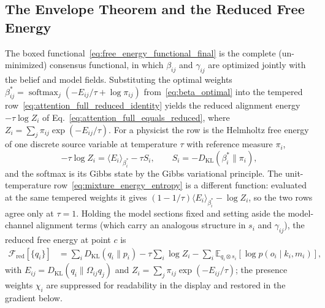 \documentclass[11pt]{article}
\begin{document}
\subsection{The Envelope Theorem and the Reduced Free Energy}
\label{sec:envelope_theorem}

The boxed functional~\eqref{eq:free_energy_functional_final} is the complete (un-minimized) consensus functional, in which $\beta_{ij}$ and $\gamma_{ij}$ are optimized jointly with the belief and model fields. Substituting the optimal weights $\beta_{ij}^* = \operatorname{softmax}_j(-E_{ij}/\tau + \log\pi_{ij})$ from~\eqref{eq:beta_optimal} into the tempered row~\eqref{eq:attention_full_reduced_identity} yields the reduced alignment energy $-\tau\log Z_i$ of Eq.~\eqref{eq:attention_full_equals_reduced}, where $Z_i = \sum_j \pi_{ij}\exp(-E_{ij}/\tau)$. For a physicist the row is the Helmholtz free energy of one discrete source variable at temperature $\tau$ with reference measure $\pi_i$,
\begin{equation}
-\tau\log Z_i = \langle E_i\rangle_{\beta_i^*} - \tau S_i,
\qquad
S_i = -D_{\mathrm{KL}}(\beta_i^*\|\pi_i),
\end{equation}
and the softmax is its Gibbs state by the Gibbs variational principle. The unit-temperature row~\eqref{eq:mixture_energy_entropy} is a different function: evaluated at the same tempered weights it gives $(1-1/\tau)\langle E_i\rangle_{\beta_i^*}-\log Z_i$, so the two rows agree only at $\tau=1$. Holding the model sections fixed and setting aside the model-channel alignment terms (which carry an analogous structure in $s_i$ and $\gamma_{ij}$), the reduced free energy at point $c$ is
\begin{equation}
\boxed{
\begin{aligned}
\mathcal{F}_{\mathrm{red}}[\{q_i\}]
&=\sum_i D_{\mathrm{KL}}(q_i\|p_i)
-\tau\sum_i \log Z_i
-\sum_i \mathbb{E}_{q_i\otimes s_i}[\log p(o_i\mid k_i,m_i)],
\end{aligned}
}
\label{eq:free_energy_reduced}
\end{equation}
with $E_{ij} = D_{\mathrm{KL}}(q_i \| \Omega_{ij} q_j)$ and $Z_i = \sum_j \pi_{ij} \exp(-E_{ij}/\tau)$; the presence weights $\chi_i$ are suppressed for readability in the display and restored in the gradient below.
\end{document}
